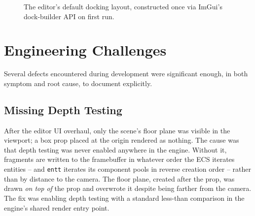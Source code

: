 \documentclass[conference]{IEEEtran}
\begin{document}
\begin{figure}[htbp]
\centering
{}
\caption{The editor's default docking layout, constructed once via
ImGui's dock-builder API on first run.}
\label{fig:editor-layout}
\end{figure}

\section{Engineering Challenges}
\label{sec:challenges}

Several defects encountered during development were significant enough,
in both symptom and root cause, to document explicitly.

\subsection{Missing Depth Testing}
After the editor UI overhaul, only the scene's floor plane was visible
in the viewport; a box prop placed at the origin rendered as nothing.
The cause was that depth testing was never enabled anywhere in the
engine. Without it, fragments are written to the framebuffer in whatever
order the ECS iterates entities -- and \texttt{entt} iterates its
component pools in reverse creation order -- rather than by distance to
the camera. The floor plane, created after the prop, was drawn
\emph{on top of} the prop and overwrote it despite being farther from
the camera. The fix was enabling depth testing with a standard
less-than comparison in the engine's shared render entry point.
\end{document}
